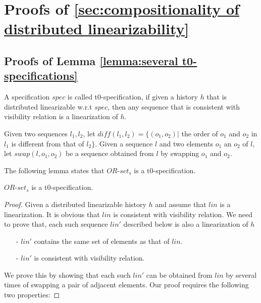 \forget
{
\section{Proofs of \sectionautorefname \ref{sec:compositionality of distributed linearizability}}
\label{sec:appendix proofs of section compositionality of distributed linearizability}



\subsection{Proofs of Lemma \ref{lemma:several t0-specifications}}
\label{subsec:appendix proofs of Lemma several t0-specifications}

A specification $\mathit{spec}$ is called t0-specification, if given a history $h$ that is distributed linearizable w.r.t $\mathit{spec}$, then any sequence that is consistent with visibility relation is a linearization of $h$.

Given two sequences $l_1,l_2$, let $\mathit{diff}(l_1,l_2) = \{ (o_1,o_2) \vert$ the order of $o_1$ and $o_2$ in $l_1$ is different from that of $l_2 \}$. Given a sequence $l$ and two elements $o_1$ an $o_2$ of $l$, let $\mathit{swap}(l,o_1,o_2)$ be a sequence obtained from $l$ by swapping $o_1$ and $o_2$.

The following lemma states that $\mathit{OR}$-$\mathit{set}_s$ is a t0-specification.

\begin{lemma}
\label{lemma:or-set is a t0-specification}
$\mathit{OR}$-$\mathit{set}_s$ is a t0-specification.
\end{lemma}

\begin {proof}
Given a distributed linearizable history $h$ and assume that $\mathit{lin}$ is a linearization. It is obvious that $\mathit{lin}$ is consistent with visibility relation. We need to prove that, each such sequence $\mathit{lin}'$ described below is also a linearization of $h$

\begin{itemize}
\setlength{\itemsep}{0.5pt}
\item[-] $\mathit{lin}'$ contains the same set of elements as that of $\mathit{lin}$.

\item[-] $\mathit{lin}'$ is consistent with visibility relation.
\end{itemize}

We prove this by showing that each such $\mathit{lin}'$ can be obtained from $\mathit{lin}$ by several times of swapping a pair of adjacent elements. Our proof requires the following two properties:


\end{proof}}
